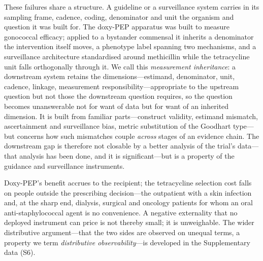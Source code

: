 \documentclass[12pt,a4paper]{article}
\begin{document}
These failures share a structure. A guideline or a surveillance system carries in
its sampling frame, cadence, coding, denominator and unit the organism and
question it was built for. The doxy-PEP apparatus was built to measure gonococcal
efficacy; applied to a bystander commensal it inherits a denominator the
intervention itself moves, a phenotype label spanning two mechanisms, and a
surveillance architecture standardised around methicillin while the tetracycline
unit falls orthogonally through it. We call this \emph{measurement inheritance}: a
downstream system retains the dimensions---estimand, denominator, unit, cadence,
linkage, measurement responsibility---appropriate to the upstream question but not
those the downstream question requires, so the question becomes unanswerable not
for want of data but for want of an inherited dimension. It is built from
familiar parts---construct validity, estimand mismatch, ascertainment and
surveillance bias,\cite{tancredi2024surveillance} metric substitution of the
Goodhart type\cite{treem2023visibility}---but concerns how such mismatches couple
\emph{across} stages of an evidence chain. The downstream gap is therefore not
closable by a better analysis of the trial's data---that analysis has been done,
and it is significant---but is a property of the guidance and surveillance
instruments.

Doxy-PEP's benefit accrues to the recipient; the tetracycline selection cost
falls on people outside the prescribing decision---the outpatient with a skin
infection and, at the sharp end, dialysis, surgical and oncology patients for whom
an oral anti-staphylococcal agent is no convenience. A negative externality that
no deployed instrument can price is not thereby small; it is unweighable. The
wider distributive argument---that the two sides are observed on unequal terms, a
property we term \emph{distributive observability}---is developed in the
Supplementary data (S6).\cite{montoya2025affected}
\end{document}
